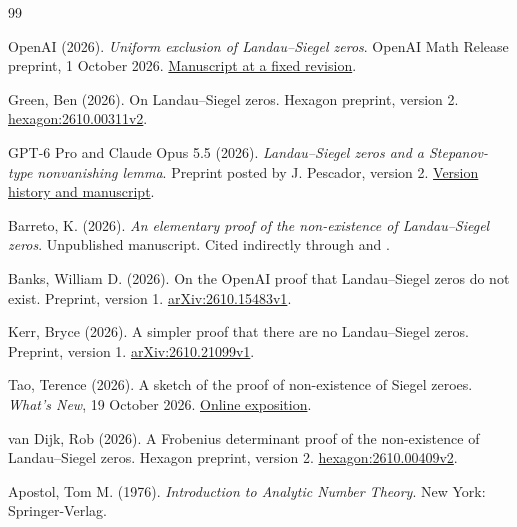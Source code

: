 \documentclass[11pt,twoside,leqno]{article}
\theoremstyle{apostol}
\begin{document}
\titlespacing*{\section}{0pt}{8pt}{4pt}
\begin{thebibliography}{99}
\footnotesize\raggedright
{}
\setlength{\itemsep}{0pt}
\setlength{\parskip}{0pt}

OpenAI (2026). \emph{Uniform exclusion of Landau--Siegel zeros}.
OpenAI Math Release preprint, 1 October 2026.
\href{https://github.com/openai/math/blob/adc7f1241b42e322a6451854ab7e4b4c146bf78a/preprints/Uniform-exclusion-of-Landau-Siegel-zeros-October-1-2026/paper.pdf}
{Manuscript at a fixed revision}.

Green, Ben (2026). On Landau--Siegel zeros. Hexagon preprint, version 2.
\href{https://hexagonmath.org/2610.00311v2}{hexagon:2610.00311v2}.

GPT-6 Pro and Claude Opus 5.5 (2026). \emph{Landau--Siegel zeros and a
Stepanov-type nonvanishing lemma}. Preprint posted by J. Pescador, version 2.
\href{https://jacobpescador.github.io/ai-math/papers/landau-siegel-stepanov/}
{Version history and manuscript}.

Barreto, K. (2026). \emph{An elementary proof of the non-existence of
Landau--Siegel zeros}. Unpublished manuscript. Cited indirectly through
\cite{stepanovnote} and \cite{vandijk}.

Banks, William D. (2026). On the OpenAI proof that Landau--Siegel zeros
do not exist. Preprint, version 1.
\href{https://arxiv.org/abs/2610.15483v1}{arXiv:2610.15483v1}.

Kerr, Bryce (2026). A simpler proof that there are no Landau--Siegel zeros.
Preprint, version 1.
\href{https://arxiv.org/abs/2610.21099v1}{arXiv:2610.21099v1}.

Tao, Terence (2026). A sketch of the proof of non-existence of Siegel
zeroes. \emph{What's New}, 19 October 2026.
\href{https://terrytao.wordpress.com/2026/10/19/a-sketch-of-the-proof-of-non-existence-of-siegel-zeroes/}
{Online exposition}.

van Dijk, Rob (2026). A Frobenius determinant proof of the non-existence of
Landau--Siegel zeros. Hexagon preprint, version 2.
\href{https://hexagonmath.org/2610.00409v2}{hexagon:2610.00409v2}.

Apostol, Tom M. (1976). \emph{Introduction to Analytic Number Theory}.
New York: Springer-Verlag.


\end{thebibliography}
\end{document}
